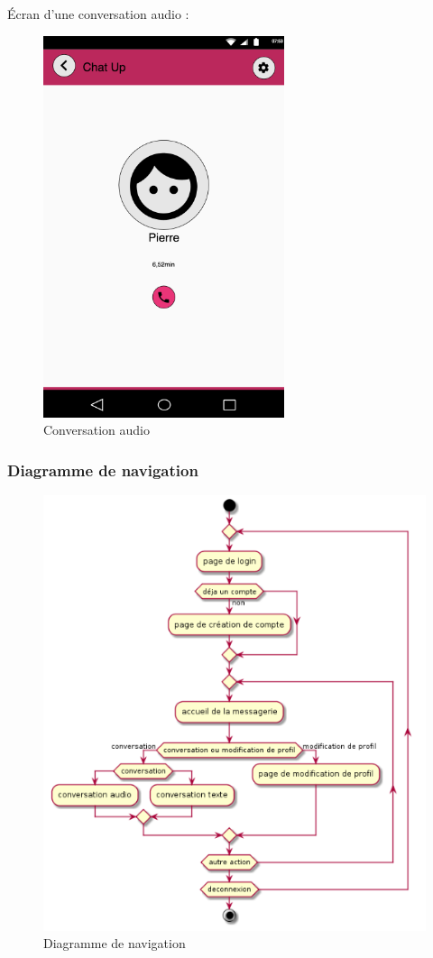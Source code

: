 Écran d’une conversation audio :

	\begin{figure}[H]
		\centering \includegraphics[scale=0.5]{img/audio.png}
		\caption{Conversation audio}
	\end{figure}

\subsubsection{Diagramme de navigation}


	\begin{figure}[H]
		\centering \includegraphics[scale=0.5]{img/diag_navigation.png}
		\caption{Diagramme de navigation}
	\end{figure}
	
